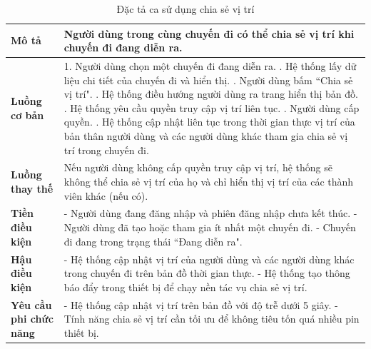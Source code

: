 \begin{longtable}{| p{4cm} | p{\dimexpr\linewidth-4cm-4\tabcolsep} |} %
    \caption{Đặc tả ca sử dụng chia sẻ vị trí} %
    \label{tab:uc_share_location_spec} \\ %

    \hline
    \textbf{Mô tả} & Người dùng trong cùng chuyến đi có thể chia sẻ vị trí khi chuyến đi đang diễn ra. \\
    \hline
    \endfirsthead %



    \hline %
    \endlastfoot

    \textbf{Luồng cơ bản} & 1. Người dùng chọn một chuyến đi đang diễn ra. \newline
                           2. Hệ thống lấy dữ liệu chi tiết của chuyến đi và hiển thị. \newline
                           3. Người dùng bấm ``Chia sẻ vị trí". \newline
                           4. Hệ thống điều hướng người dùng ra trang hiển thị bản đồ. \newline
                           5. Hệ thống yêu cầu quyền truy cập vị trí liên tục. \newline
                           6. Người dùng cấp quyền. \newline
                           7. Hệ thống cập nhật liên tục trong thời gian thực vị trí của bản thân người dùng và các người dùng khác tham gia chia sẻ vị trí trong chuyến đi. \\
    \hline
    \textbf{Luồng thay thế} & Nếu người dùng không cấp quyền truy cập vị trí, hệ thống sẽ không thể chia sẻ vị trí của họ và chỉ hiển thị vị trí của các thành viên khác (nếu có). \\
    \hline
    \textbf{Tiền điều kiện} & - Người dùng đang đăng nhập và phiên đăng nhập chưa kết thúc.\newline
                           - Người dùng đã tạo hoặc tham gia ít nhất một chuyến đi. \newline
                           - Chuyến đi đang trong trạng thái ``Đang diễn ra". \\
    \hline
    \textbf{Hậu điều kiện} & - Hệ thống cập nhật vị trí của người dùng và các người dùng khác trong chuyến đi trên bản đồ thời gian thực. \newline
                           - Hệ thống tạo thông báo đẩy trong thiết bị để chạy nền tác vụ chia sẻ vị trí. \\
    \hline
    \textbf{Yêu cầu phi chức năng} & - Hệ thống cập nhật vị trí trên bản đồ với độ trễ dưới 5 giây. \newline
                                   - Tính năng chia sẻ vị trí cần tối ưu để không tiêu tốn quá nhiều pin thiết bị. \\

\end{longtable}
